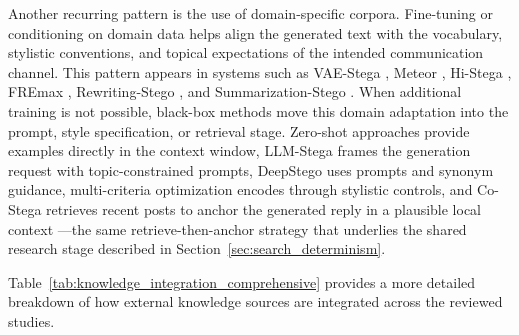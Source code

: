 Another recurring pattern is the use of domain-specific corpora. Fine-tuning or conditioning on domain data helps align the generated text with the vocabulary, stylistic conventions, and topical expectations of the intended communication channel. This pattern appears in systems such as VAE-Stega \cite{yang2020vae}, Meteor \cite{kaptchuk2021meteor}, Hi-Stega \cite{wang2023hi}, FREmax \cite{pang2024fremax}, Rewriting-Stego \cite{li2023rewriting}, and Summarization-Stego \cite{zhang2024controllable}. When additional training is not possible, black-box methods move this domain adaptation into the prompt, style specification, or retrieval stage. Zero-shot approaches provide examples directly in the context window, LLM-Stega frames the generation request with topic-constrained prompts, DeepStego uses prompts and synonym guidance, multi-criteria optimization encodes through stylistic controls, and Co-Stega retrieves recent posts to anchor the generated reply in a plausible local context \cite{lin2024zero,wu2024generative,kuznetsov2025deepstego,wozniak2025multicriteria,liao2024co}---the same retrieve-then-anchor strategy that underlies the shared research stage described in Section~\ref{sec:search_determinism}.

Table~\ref{tab:knowledge_integration_comprehensive} provides a more detailed breakdown of how external knowledge sources are integrated across the reviewed studies.

